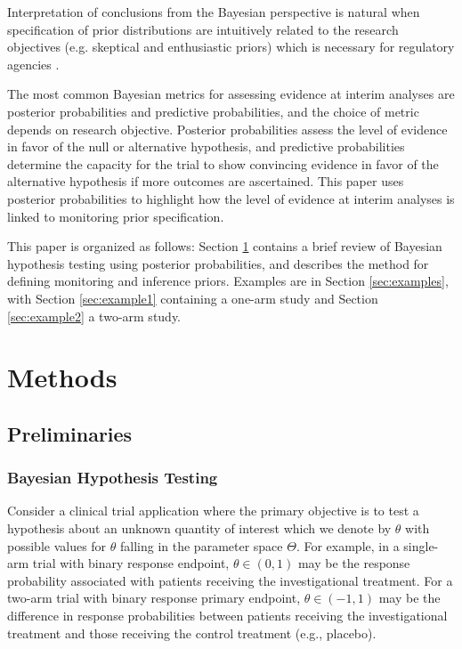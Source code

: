\documentclass[12pt]{article}
\begin{document}
Interpretation of conclusions from the Bayesian perspective is natural when specification of prior distributions are intuitively related to the research objectives (e.g. skeptical and enthusiastic priors)  \citep{Freedman1989,Freedman1992,Spiegelhalter1993,Fayers1997} which is necessary for regulatory agencies \citep{Parmar1993}. %

The most common Bayesian metrics for assessing evidence at interim analyses are posterior probabilities and predictive probabilities, and the choice of metric depends on research objective. Posterior probabilities assess the level of evidence in favor of the null or alternative hypothesis, and predictive probabilities determine the capacity for the trial to show convincing evidence in favor of the alternative hypothesis if more outcomes are ascertained. This paper uses posterior probabilities to highlight how the level of evidence at interim analyses is linked to monitoring prior specification.

This paper is organized as follows: Section \ref{sec:methods} contains a brief review of Bayesian hypothesis testing using posterior probabilities, and describes the method for defining monitoring and inference priors. Examples are in Section \ref{sec:examples}, with Section \ref{sec:example1} containing a one-arm study and Section \ref{sec:example2} a two-arm study.

\section{Methods}\label{sec:methods}

\subsection{Preliminaries}\label{sec:preliminaries}
\subsubsection{Bayesian Hypothesis Testing}
Consider a clinical trial application where the primary objective is to test a hypothesis about an unknown quantity of interest which we denote by $\theta$ with possible values
for $\theta$ falling in the parameter space $\Theta$.
%
For example, in a single-arm trial with binary response endpoint, $\theta \in (0,1)$ may be the response probability associated with patients receiving the investigational treatment.
%
For a two-arm trial with binary response primary endpoint, $\theta \in (-1,1)$ may be the difference in response probabilities between patients receiving the investigational treatment 
and those receiving the control treatment (e.g., placebo).
\end{document}
